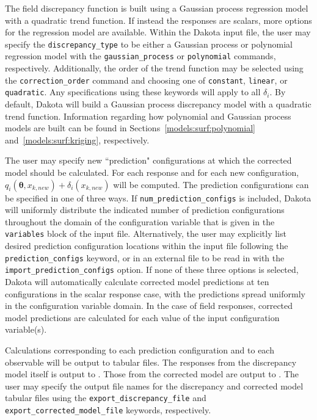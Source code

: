 The field discrepancy function is built using a Gaussian process regression
model with a quadratic trend function. If instead the responses are scalars, 
more options for the regression model are available. Within the Dakota input 
file, the user may specify the \texttt{discrepancy\_type} to be either a 
Gaussian process or polynomial regression model with the 
\texttt{gaussian\_process} or \texttt{polynomial} commands, respectively. 
Additionally, the order of the trend function may be selected using the 
\texttt{correction\_order} command and choosing one of \texttt{constant}, 
\texttt{linear}, or \texttt{quadratic}. Any specifications using these keywords 
will apply to all $\delta_i$. By default, Dakota will build a Gaussian process 
discrepancy model with a quadratic trend function. Information regarding how 
polynomial and Gaussian process models are built can be found in 
Sections~\ref{models:surf:polynomial} and~\ref{models:surf:kriging}, 
respectively. 

The user may specify new ``prediction" configurations at which the 
corrected model should be calculated. For each response and for each new
configuration, $q_i(\boldsymbol{\theta}, x_{k,new}) + \delta_i(x_{k,new})$ 
will be computed. The prediction configurations can be specified in one of
three ways. If \texttt{num\_prediction\_configs} is included, Dakota will 
uniformly distribute the indicated number of prediction configurations 
throughout the domain of the configuration variable that is given in the 
\texttt{variables} block of the input file. Alternatively, the user may 
explicitly list desired prediction configuration locations within the input
file following the \texttt{prediction\_configs} keyword, or in an external
file to be read in with the \texttt{import\_prediction\_configs} option. If 
none of these three options is selected, Dakota will automatically calculate
corrected model predictions at ten configurations in the scalar response case, 
with the predictions spread uniformly in the configuration variable domain. In 
the case of field responses, corrected model predictions are calculated for each
value of the input configuration variable(s).

Calculations corresponding to each prediction configuration and to each
observable will be output to tabular files. The responses from the discrepancy
model itself is output to . Those
from the corrected model are output to .
The user may specify the output file names for the discrepancy and corrected
model tabular files using the \texttt{export\_discrepancy\_file} and
\texttt{export\_corrected\_model\_file} keywords, respectively. 


